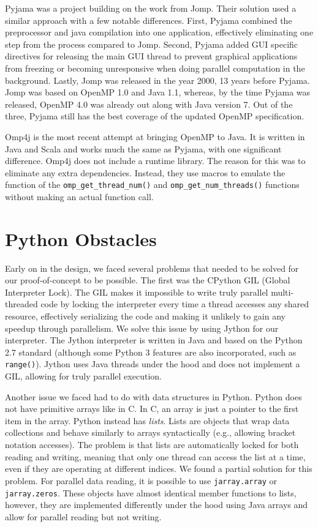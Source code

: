 \documentclass[letterpaper,12pt]{article} %
\begin{document}
Pyjama \cite{giacaman2013pyjama} was a project building on the work from Jomp. Their solution used a similar approach with a few notable differences. First, Pyjama combined the preprocessor and java compilation into one application, effectively eliminating one step from the process compared to Jomp. Second, Pyjama added GUI specific directives for releasing the main GUI thread to prevent graphical applications from freezing or becoming unresponsive when doing parallel computation in the background. Lastly, Jomp was released in the year 2000, 13 years before Pyjama. Jomp was based on OpenMP 1.0 and Java 1.1, whereas, by the time Pyjama was released, OpenMP 4.0 was already out along with Java version 7. Out of the three, Pyjama still has the best coverage of the updated OpenMP specification.

Omp4j \cite{bvelohlavek2015openmp} is the most recent attempt at bringing OpenMP to Java. It is written in Java and Scala and works much the same as Pyjama, with one significant difference. Omp4j does not include a runtime library. The reason for this was to eliminate any extra dependencies. Instead, they use macros to emulate the function of the \texttt{omp\_get\_thread\_num()} and \texttt{omp\_get\_num\_threads()} functions without making an actual function call.


\section{Python Obstacles}
Early on in the design, we faced several problems that needed to be solved for our proof-of-concept to be possible. The first was the CPython GIL (Global Interpreter Lock). The GIL makes it impossible to write truly parallel multi-threaded code by locking the interpreter every time a thread accesses any shared resource, effectively serializing the code and making it unlikely to gain any speedup through parallelism. We solve this issue by using Jython for our interpreter. The Jython interpreter is written in Java and based on the Python 2.7 standard (although some Python 3 features are also incorporated, such as \texttt{range()}). Jython uses Java threads under the hood and does not implement a GIL, allowing for truly parallel execution. 

Another issue we faced had to do with data structures in Python. Python does not have primitive arrays like in C. In C, an array is just a pointer to the first item in the array. Python instead has \textit{lists}. Lists are objects that wrap data collections and behave similarly to arrays syntactically (e.g., allowing bracket notation accesses). The problem is that lists are automatically locked for both reading and writing, meaning that only one thread can access the list at a time, even if they are operating at different indices. We found a partial solution for this problem. For parallel data reading, it is possible to use \texttt{jarray.array} or \texttt{jarray.zeros}. These objects have almost identical member functions to lists, however, they are implemented differently under the hood using Java arrays and allow for parallel reading but not writing. 
\end{document}
